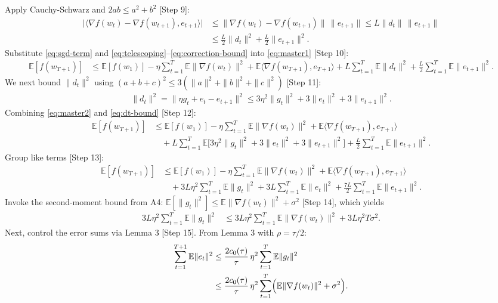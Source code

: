 \documentclass[11pt]{article}
\newcommand{\E}{\mathbb{E}}
\begin{document}
Apply Cauchy-Schwarz and $2ab \le a^2+b^2$ [Step 9]:
\begin{align}
\bigl|\langle \nabla f(w_t) - \nabla f(w_{t+1}), e_{t+1}\rangle\bigr|
&\le \|\nabla f(w_t) - \nabla f(w_{t+1})\|\, \|e_{t+1}\|
\le L\|d_t\|\, \|e_{t+1}\| \nonumber \\
&\le \frac{L}{2}\|d_t\|^2 + \frac{L}{2}\|e_{t+1}\|^2. \label{eq:correction-bound}
\end{align}
Substitute \eqref{eq:sgd-term} and \eqref{eq:telescoping}--\eqref{eq:correction-bound} into \eqref{eq:master1} [Step 10]:
\begin{align}
\E[f(w_{T+1})]
&\le \E[f(w_1)] - \eta \sum_{t=1}^T \E\|\nabla f(w_t)\|^2 
+ \E\langle \nabla f(w_{T+1}), e_{T+1}\rangle
+ L \sum_{t=1}^T \E\|d_t\|^2
+ \frac{L}{2}\sum_{t=1}^T \E\|e_{t+1}\|^2.
\label{eq:master2}
\end{align}
We next bound $\|d_t\|^2$ using $(a+b+c)^2 \le 3(\|a\|^2+\|b\|^2+\|c\|^2)$ [Step 11]:
\begin{align}
\|d_t\|^2 
= \|\eta g_t + e_t - e_{t+1}\|^2
\le 3\eta^2 \|g_t\|^2 + 3\|e_t\|^2 + 3\|e_{t+1}\|^2. \label{eq:dt-bound}
\end{align}
Combining \eqref{eq:master2} and \eqref{eq:dt-bound} [Step 12]:
\begin{align}
\E[f(w_{T+1})]
&\le \E[f(w_1)] - \eta \sum_{t=1}^T \E\|\nabla f(w_t)\|^2 
+ \E\langle \nabla f(w_{T+1}), e_{T+1}\rangle \nonumber\\
&\quad + L \sum_{t=1}^T \E\bigl[3\eta^2 \|g_t\|^2 + 3\|e_t\|^2 + 3\|e_{t+1}\|^2\bigr]
+ \frac{L}{2}\sum_{t=1}^T \E\|e_{t+1}\|^2. \label{eq:master3}
\end{align}
Group like terms [Step 13]:
\begin{align}
\E[f(w_{T+1})]
&\le \E[f(w_1)] - \eta \sum_{t=1}^T \E\|\nabla f(w_t)\|^2 
+ \E\langle \nabla f(w_{T+1}), e_{T+1}\rangle \nonumber\\
&\quad + 3L\eta^2 \sum_{t=1}^T \E\|g_t\|^2 
+ 3L \sum_{t=1}^T \E\|e_t\|^2 
+ \frac{7L}{2}\sum_{t=1}^T \E\|e_{t+1}\|^2. \label{eq:master4}
\end{align}
Invoke the second-moment bound from A4: $\E[\|g_t\|^2] \le \E\|\nabla f(w_t)\|^2 + \sigma^2$ [Step 14], which yields
\begin{align}
3L\eta^2 \sum_{t=1}^T \E\|g_t\|^2 
&\le 3L\eta^2 \sum_{t=1}^T \E\|\nabla f(w_t)\|^2 + 3L\eta^2 T \sigma^2. \label{eq:g2-split}
\end{align}
Next, control the error sums via Lemma 3 [Step 15]. From Lemma 3 with $\rho=\tau/2$:
\begin{align}
\sum_{t=1}^{T+1} \E\|e_t\|^2 
&\le \frac{2 c_0(\tau)}{\tau}\,\eta^2 \sum_{t=1}^{T} \E\|g_t\|^2 \nonumber\\
&\le \frac{2 c_0(\tau)}{\tau}\,\eta^2 \sum_{t=1}^{T}\Bigl(\E\|\nabla f(w_t)\|^2 + \sigma^2\Bigr). \label{eq:e-sum}
\end{align}
\end{document}
